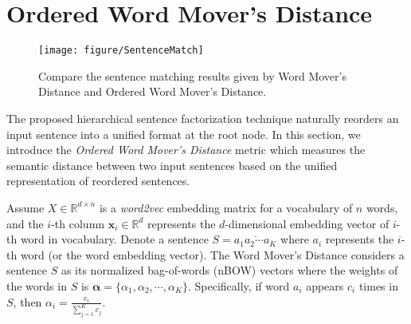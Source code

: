 \section{Ordered Word Mover's Distance}
\label{sec:owmd}

\begin{figure}[tb]
\centering
\texttt{[image: figure/SentenceMatch]}
\vspace{0mm}
\caption{Compare the sentence matching results given by Word Mover's Distance and Ordered Word Mover's Distance.}
\label{fig:match}
\vspace{-3mm}
\end{figure}

The proposed hierarchical sentence factorization technique naturally reorders an input sentence into a unified format at the root node. In this section, we introduce the \textit{Ordered Word Mover's Distance} metric which measures the semantic distance between two input sentences based on the unified representation of reordered sentences.

Assume $X\in \mathbb{R}^{d\times n}$ is a \textit{word2vec} embedding matrix for a vocabulary of $n$ words, and the $i$-th column $\mathbf{x}_i \in \mathbb{R}^d$ represents the $d$-dimensional embedding vector of $i$-th word in vocabulary.
Denote a sentence $S = \overline{a_1a_2\cdots a_K}$ where $a_i$ represents the $i$-th word (or the word embedding vector).
The Word Mover's Distance considers a sentence $S$ as its normalized bag-of-words (nBOW) vectors where the weights of the words in $S$ is $\mathbf \alpha = \{\alpha_1, \alpha_2, \cdots, \alpha_K\}$. Specifically, if word $a_i$ appears $c_i$ times in $S$, then $\alpha_i = \frac{c_i}{\sum_{j=1}^K c_j}$.

